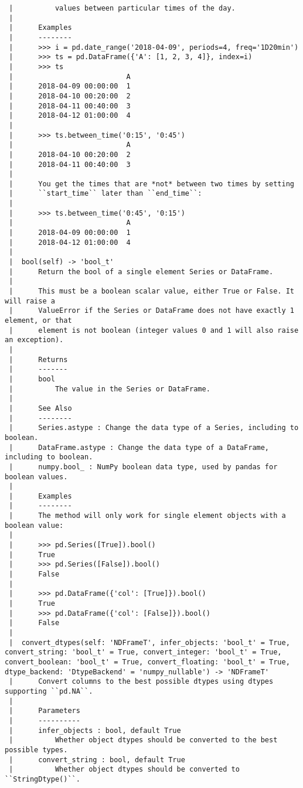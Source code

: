 \documentclass[
  letterpaper,
  DIV=11,
  numbers=noendperiod]{scrreprt}
\begin{document}
\begin{verbatim}
 |          values between particular times of the day.
 |      
 |      Examples
 |      --------
 |      >>> i = pd.date_range('2018-04-09', periods=4, freq='1D20min')
 |      >>> ts = pd.DataFrame({'A': [1, 2, 3, 4]}, index=i)
 |      >>> ts
 |                           A
 |      2018-04-09 00:00:00  1
 |      2018-04-10 00:20:00  2
 |      2018-04-11 00:40:00  3
 |      2018-04-12 01:00:00  4
 |      
 |      >>> ts.between_time('0:15', '0:45')
 |                           A
 |      2018-04-10 00:20:00  2
 |      2018-04-11 00:40:00  3
 |      
 |      You get the times that are *not* between two times by setting
 |      ``start_time`` later than ``end_time``:
 |      
 |      >>> ts.between_time('0:45', '0:15')
 |                           A
 |      2018-04-09 00:00:00  1
 |      2018-04-12 01:00:00  4
 |  
 |  bool(self) -> 'bool_t'
 |      Return the bool of a single element Series or DataFrame.
 |      
 |      This must be a boolean scalar value, either True or False. It will raise a
 |      ValueError if the Series or DataFrame does not have exactly 1 element, or that
 |      element is not boolean (integer values 0 and 1 will also raise an exception).
 |      
 |      Returns
 |      -------
 |      bool
 |          The value in the Series or DataFrame.
 |      
 |      See Also
 |      --------
 |      Series.astype : Change the data type of a Series, including to boolean.
 |      DataFrame.astype : Change the data type of a DataFrame, including to boolean.
 |      numpy.bool_ : NumPy boolean data type, used by pandas for boolean values.
 |      
 |      Examples
 |      --------
 |      The method will only work for single element objects with a boolean value:
 |      
 |      >>> pd.Series([True]).bool()
 |      True
 |      >>> pd.Series([False]).bool()
 |      False
 |      
 |      >>> pd.DataFrame({'col': [True]}).bool()
 |      True
 |      >>> pd.DataFrame({'col': [False]}).bool()
 |      False
 |  
 |  convert_dtypes(self: 'NDFrameT', infer_objects: 'bool_t' = True, convert_string: 'bool_t' = True, convert_integer: 'bool_t' = True, convert_boolean: 'bool_t' = True, convert_floating: 'bool_t' = True, dtype_backend: 'DtypeBackend' = 'numpy_nullable') -> 'NDFrameT'
 |      Convert columns to the best possible dtypes using dtypes supporting ``pd.NA``.
 |      
 |      Parameters
 |      ----------
 |      infer_objects : bool, default True
 |          Whether object dtypes should be converted to the best possible types.
 |      convert_string : bool, default True
 |          Whether object dtypes should be converted to ``StringDtype()``.

\end{verbatim}
\end{document}
